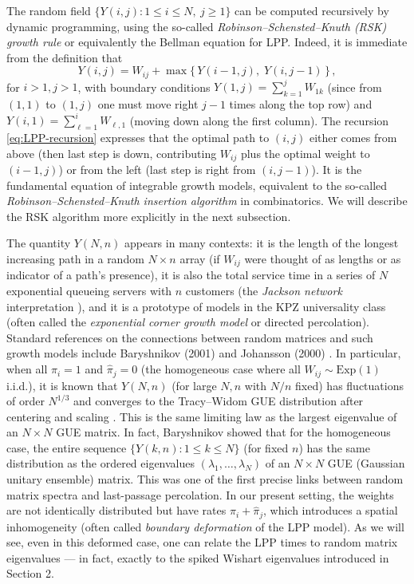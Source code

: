 \documentclass[letterpaper,11pt,oneside,reqno]{article}
\numberwithin{equation}{section}
\theoremstyle{definition}
\begin{document}
The random field $\{Y(i,j): 1\le i\le N,\ j\ge 1\}$ can be computed recursively by dynamic programming, using the so-called \emph{Robinson--Schensted--Knuth (RSK) growth rule} or equivalently the Bellman equation for LPP. Indeed, it is immediate from the definition that
\begin{equation}\label{eq:LPP-recursion}
Y(i,j) = W_{ij} + \max\{\, Y(i-1,j),\; Y(i,j-1)\,\}\,,
\end{equation}
for $i>1, j>1$, with boundary conditions $Y(1,j) = \sum_{k=1}^j W_{1k}$ (since from $(1,1)$ to $(1,j)$ one must move right $j-1$ times along the top row) and $Y(i,1) = \sum_{\ell=1}^i W_{\ell,1}$ (moving down along the first column). The recursion \eqref{eq:LPP-recursion} expresses that the optimal path to $(i,j)$ either comes from above (then last step is down, contributing $W_{ij}$ plus the optimal weight to $(i-1,j)$) or from the left (last step is right from $(i,j-1)$). It is the fundamental equation of integrable growth models, equivalent to the so-called \emph{Robinson--Schensted--Knuth insertion algorithm} in combinatorics. We will describe the RSK algorithm more explicitly in the next subsection.

The quantity $Y(N,n)$ appears in many contexts: it is the length of the longest increasing path in a random $N\times n$ array (if $W_{ij}$ were thought of as lengths or as indicator of a path's presence), it is also the total service time in a series of $N$ exponential queueing servers with $n$ customers (the \emph{Jackson network} interpretation \cite{Baryshnikov_GUE2001}), and it is a prototype of models in the KPZ universality class (often called the \emph{exponential corner growth model} or directed percolation). Standard references on the connections between random matrices and such growth models include Baryshnikov (2001) \cite{Baryshnikov_GUE2001} and Johansson (2000) \cite{Johansson2000}. In particular, when all $\pi_i=1$ and $\hat\pi_j=0$ (the homogeneous case where all $W_{ij}\sim \mathrm{Exp}(1)$ i.i.d.), it is known that $Y(N,n)$ (for large $N,n$ with $N/n$ fixed) has fluctuations of order $N^{1/3}$ and converges to the Tracy--Widom GUE distribution after centering and scaling \cite{Johansson2000}. This is the same limiting law as the largest eigenvalue of an $N\times N$ GUE matrix. In fact, Baryshnikov \cite{Baryshnikov_GUE2001} showed that for the homogeneous case, the entire sequence $\{Y(k,n):1\le k\le N\}$ (for fixed $n$) has the same distribution as the ordered eigenvalues $(\lambda_1,\dots,\lambda_N)$ of an $N\times N$ GUE (Gaussian unitary ensemble) matrix. This was one of the first precise links between random matrix spectra and last-passage percolation. In our present setting, the weights are not identically distributed but have rates $\pi_i+\hat\pi_j$, which introduces a spatial inhomogeneity (often called \emph{boundary deformation} of the LPP model). As we will see, even in this deformed case, one can relate the LPP times to random matrix eigenvalues --- in fact, exactly to the spiked Wishart eigenvalues introduced in Section 2.
\end{document}
